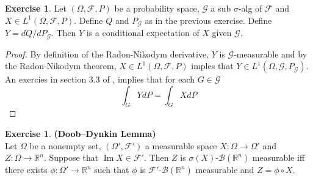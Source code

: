 \documentclass[12pt]{amsart}
\theoremstyle{definition}
\newtheorem{ex}[definition]{Exercise}
\newcommand{\sig}{\sigma}
\newcommand{\Om}{\Omega}
\newcommand{\R}{\mathbb{R}}
\newcommand{\MB}{\mathcal{B}}
\newcommand{\MF}{\mathcal{F}}
\newcommand{\MG}{\mathcal{G}}
\DeclareMathOperator{\Img}{Im}
\begin{document}
	\begin{ex}
	Let $(\Om, \MF, P)$ be a probability space, $\MG$ a sub $\sig$-alg of $\MF$ and $X \in L^1(\Om, \MF, P)$. Define $Q$ and $P_{\MG}$ as in the previous exercise. Define $Y = dQ/dP_{\MG}$. Then $Y$ is a conditional expectation of $X$ given $\MG$.
	\end{ex}
	
	\begin{proof}
		By definition of the Radon-Nikodym derivative, $Y$ is $\MG$-measurable and by the Radon-Nikodym theorem, $X \in L^1(\Om, \MF, P)$ imples that $Y \in L^1(\Om, \MG, P_{\MG})$. An exercies in section $3.3$ of \cite{imi}, implies that for each $G \in \MG$ $$\int_G Y dP = \int_G X dP$$
	\end{proof}	
	
	
	
	\begin{ex}\textbf{(Doob–Dynkin Lemma)} \\
	Let $\Om$ be a nonempty set, $(\Om', \MF')$ a measurable space $X: \Om \rightarrow \Om'$ and $Z: \Om \rightarrow \R^n$. Suppose that $\Img X \in \MF'$. Then $Z$ is $\sig(X)$-$\MB(\R^n)$ measurable iff there exists $\phi:\Om' \rightarrow \R^n$ such that $\phi$ is $\MF'$-$\MB(\R^n)$ measurable and $Z = \phi \circ X$.
	\end{ex}
	
\end{document}
